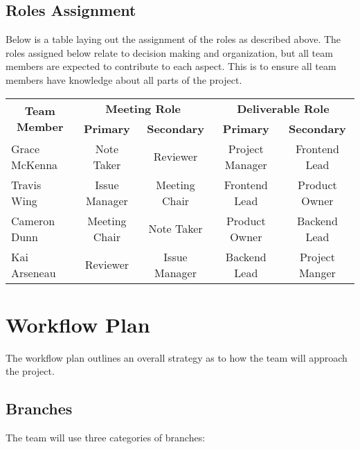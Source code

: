 \documentclass{article}
\begin{document}
\subsection*{Roles Assignment}
\noindent Below is a table laying out the assignment of the roles as described above.
The roles assigned below relate to decision making and organization, but all team members are expected to contribute to each aspect. 
This is to ensure all team members have knowledge about all parts of the project. 
\begin{table}[h]
  \begin{tabular}{lcccc}
  \hline
  \multicolumn{1}{c}{\multirow{2}{*}{\textbf{Team Member}}} & \multicolumn{2}{c}{\textbf{Meeting Role}} & \multicolumn{2}{c}{\textbf{Deliverable Role}} \\ \cline{2-5} 
  \multicolumn{1}{c}{}                                      & \textbf{Primary}   & \textbf{Secondary}   & \textbf{Primary}     & \textbf{Secondary}     \\ \hline
  Grace McKenna                                             & Note Taker         & Reviewer             & Project Manager      & Frontend Lead          \\ \hline
  Travis Wing                                               & Issue Manager      & Meeting Chair        & Frontend Lead        & Product Owner          \\ \hline
  Cameron Dunn                                              & Meeting Chair      & Note Taker           & Product Owner        & Backend Lead           \\ \hline
  Kai Arseneau                                              & Reviewer           & Issue Manager        & Backend Lead         & Project Manger         \\ \hline
  \end{tabular}
\end{table}




\section{Workflow Plan}
The workflow plan outlines an overall strategy as to how the team will approach the project.

\subsection{Branches}
The team will use three categories of branches: 
\end{document}

